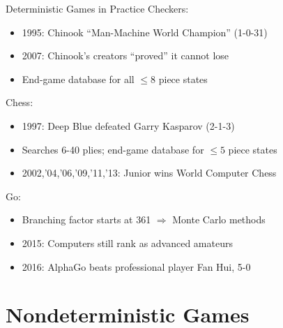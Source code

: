 \documentclass[14pt]{beamer}
\begin{document}
\begin{frame}{Deterministic Games in Practice}
	Checkers:
		\begin{itemize}
			\item\small 1995: Chinook ``Man-Machine World Champion'' (1-0-31)
			\item\small 2007: Chinook's creators ``proved'' it cannot lose
			\item\small End-game database for all $\leq 8$ piece states
		\end{itemize}
	Chess:
		\begin{itemize}
			\item\small 1997: Deep Blue defeated Garry Kasparov (2-1-3)
			\item\small Searches 6-40 plies; end-game database for $\leq 5$ piece states
			\item\small 2002,'04,'06,'09,'11,'13: Junior wins World Computer Chess
		\end{itemize}
	Go:
		\begin{itemize}
			\item\small Branching factor starts at 361 $\Rightarrow$ Monte Carlo methods
			\item\small 2015: Computers still rank as advanced amateurs
			\item\small 2016: AlphaGo beats professional player Fan Hui, 5-0 %
		\end{itemize}
\end{frame}

\section{Nondeterministic Games}
\end{document}
